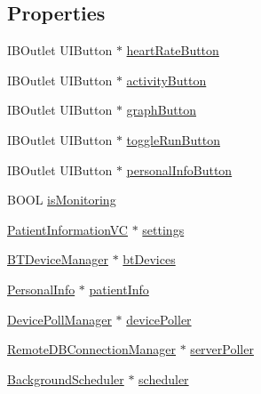 \subsection*{Properties}
\begin{DoxyCompactItemize}
\item 
I\-B\-Outlet U\-I\-Button $\ast$ \hyperlink{interface_home_screen_v_c_af710ad88b755f5ac91d32478a385af6f}{heart\-Rate\-Button}
\item 
I\-B\-Outlet U\-I\-Button $\ast$ \hyperlink{interface_home_screen_v_c_aaf7bc9fa4c07923d2df10b9dc6977c02}{activity\-Button}
\item 
I\-B\-Outlet U\-I\-Button $\ast$ \hyperlink{interface_home_screen_v_c_a1e29323a37c594f0e641d1f660605721}{graph\-Button}
\item 
I\-B\-Outlet U\-I\-Button $\ast$ \hyperlink{interface_home_screen_v_c_aad6f8311d7f241d28c255af76fea1c4b}{toggle\-Run\-Button}
\item 
I\-B\-Outlet U\-I\-Button $\ast$ \hyperlink{interface_home_screen_v_c_a8324fe604c4a1dae3d45f9b6fb63d80f}{personal\-Info\-Button}
\item 
B\-O\-O\-L \hyperlink{interface_home_screen_v_c_afa80d36d3ba21b19c0aea885cc76f811}{is\-Monitoring}
\item 
\hyperlink{interface_patient_information_v_c}{Patient\-Information\-V\-C} $\ast$ \hyperlink{interface_home_screen_v_c_a89f03faa7fe6fba12a8d17dead120a0c}{settings}
\item 
\hyperlink{interface_b_t_device_manager}{B\-T\-Device\-Manager} $\ast$ \hyperlink{interface_home_screen_v_c_a2d29b010a455bf37937421fac3bfde81}{bt\-Devices}
\item 
\hyperlink{interface_personal_info}{Personal\-Info} $\ast$ \hyperlink{interface_home_screen_v_c_a18a3276c68060f2a0fdd9fbfd32416ab}{patient\-Info}
\item 
\hyperlink{interface_device_poll_manager}{Device\-Poll\-Manager} $\ast$ \hyperlink{interface_home_screen_v_c_a2a965b7384a780e031c9cb85d18aeeb1}{device\-Poller}
\item 
\hyperlink{interface_remote_d_b_connection_manager}{Remote\-D\-B\-Connection\-Manager} $\ast$ \hyperlink{interface_home_screen_v_c_acf743bf5899a89cff1321f785b9a48e5}{server\-Poller}
\item 
\hyperlink{interface_background_scheduler}{Background\-Scheduler} $\ast$ \hyperlink{interface_home_screen_v_c_a9b110975a1b591e149fc83c768312673}{scheduler}
\end{DoxyCompactItemize}


